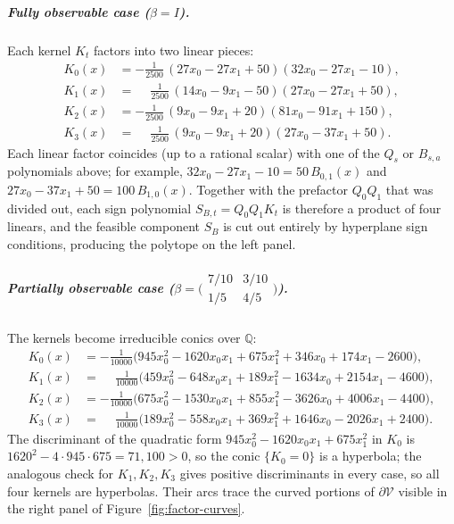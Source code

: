 \documentclass{article}
\theoremstyle{definition}
\theoremstyle{remark}
\begin{document}
\subparagraph{Fully observable case ($\beta = I$).}
Each kernel $K_t$ factors into two linear pieces:
\begin{align*}
K_0(x) &= -\tfrac{1}{2500}\,(27 x_0 - 27 x_1 + 50)(32 x_0 - 27 x_1 - 10), \\
K_1(x) &= \phantom{-}\tfrac{1}{2500}\,(14 x_0 - 9 x_1 - 50)(27 x_0 - 27 x_1 + 50), \\
K_2(x) &= -\tfrac{1}{2500}\,(9 x_0 - 9 x_1 + 20)(81 x_0 - 91 x_1 + 150), \\
K_3(x) &= \phantom{-}\tfrac{1}{2500}\,(9 x_0 - 9 x_1 + 20)(27 x_0 - 37 x_1 + 50).
\end{align*}
Each linear factor coincides (up to a rational scalar) with one of the $Q_s$ or $B_{s,a}$ polynomials above; for example, $32 x_0 - 27 x_1 - 10 = 50\, B_{0,1}(x)$ and $27 x_0 - 37 x_1 + 50 = 100\, B_{1,0}(x)$. Together with the prefactor $Q_0 Q_1$ that was divided out, each sign polynomial $S_{B,t} = Q_0 Q_1 K_t$ is therefore a product of four linears, and the feasible component $S_B$ is cut out entirely by hyperplane sign conditions, producing the polytope on the left panel.

\subparagraph{Partially observable case ($\beta = \bigl(\begin{smallmatrix} 7/10 & 3/10 \\ 1/5 & 4/5 \end{smallmatrix}\bigr)$).}
The kernels become irreducible conics over $\mathbb{Q}$:
\begin{align*}
K_0(x) &= -\tfrac{1}{10000}\bigl( 945 x_0^2 - 1620 x_0 x_1 + 675 x_1^2 + 346 x_0 + 174 x_1 - 2600 \bigr), \\
K_1(x) &= \phantom{-}\tfrac{1}{10000}\bigl( 459 x_0^2 - 648 x_0 x_1 + 189 x_1^2 - 1634 x_0 + 2154 x_1 - 4600 \bigr), \\
K_2(x) &= -\tfrac{1}{10000}\bigl( 675 x_0^2 - 1530 x_0 x_1 + 855 x_1^2 - 3626 x_0 + 4006 x_1 - 4400 \bigr), \\
K_3(x) &= \phantom{-}\tfrac{1}{10000}\bigl( 189 x_0^2 - 558 x_0 x_1 + 369 x_1^2 + 1646 x_0 - 2026 x_1 + 2400 \bigr).
\end{align*}
The discriminant of the quadratic form $945 x_0^2 - 1620 x_0 x_1 + 675 x_1^2$ in $K_0$ is $1620^2 - 4 \cdot 945 \cdot 675 = 71{,}100 > 0$, so the conic $\{K_0 = 0\}$ is a hyperbola; the analogous check for $K_1, K_2, K_3$ gives positive discriminants in every case, so all four kernels are hyperbolas. Their arcs trace the curved portions of $\partial \mathcal{V}$ visible in the right panel of Figure~\ref{fig:factor-curves}.
\end{document}

